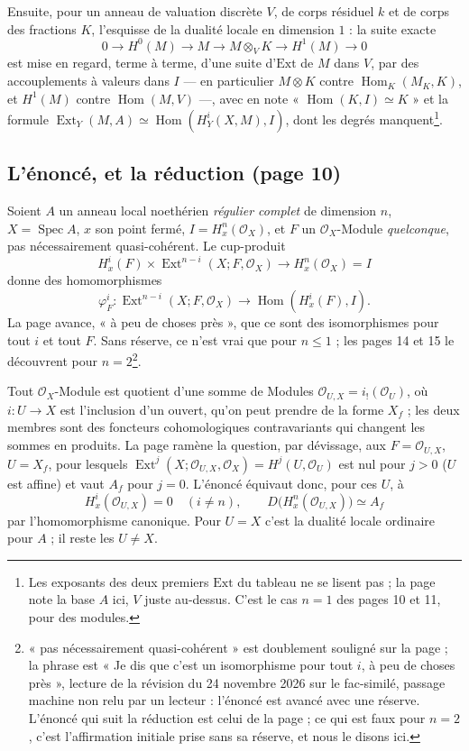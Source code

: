 \documentclass[11pt,a4paper]{article}
\begin{document}
Ensuite, pour un anneau de valuation discrète $V$, de corps résiduel $k$ et de
corps des fractions $K$, l'esquisse de la dualité locale en dimension $1$ :
la suite exacte
\[
  0 \to H^0(M) \to M \to M \otimes_V K \to H^1(M) \to 0
\]
est mise en regard, terme à terme, d'une suite d'$\mathrm{Ext}$ de $M$ dans
$V$, par des accouplements à valeurs dans $I$ --- en particulier
$M \otimes K$ contre $\operatorname{Hom}_K(M_K, K)$, et $H^1(M)$ contre
$\operatorname{Hom}(M, V)$ ---, avec en note « $\operatorname{Hom}(K, I)
\simeq K$ » et la formule
$\operatorname{Ext}_Y(M, A) \simeq \operatorname{Hom}(H^i_Y(X, M), I)$, dont
les degrés manquent\footnote{Les exposants des deux premiers $\mathrm{Ext}$ du
tableau ne se lisent pas ; la page note la base $A$ ici, $V$ juste au-dessus.
C'est le cas $n = 1$ des pages 10 et 11, pour des modules.}.

\subsection*{L'énoncé, et la réduction (page 10)}

Soient $A$ un anneau local noethérien \emph{régulier complet} de dimension $n$,
$X = \operatorname{Spec} A$, $x$ son point fermé, $I = H^n_x(\mathcal{O}_X)$,
et $F$ un $\mathcal{O}_X$-Module \emph{quelconque}, pas nécessairement
quasi-cohérent. Le cup-produit
\[
  H^i_x(F) \times \operatorname{Ext}^{n-i}(X; F, \mathcal{O}_X) \to
  H^n_x(\mathcal{O}_X) = I
\]
donne des homomorphismes
\[
  \varphi^{i}_F : \operatorname{Ext}^{n-i}(X; F, \mathcal{O}_X) \longrightarrow
  \operatorname{Hom}(H^i_x(F), I).
\]
La page avance, « à peu de choses près », que ce sont des isomorphismes pour
tout $i$ et tout $F$. Sans réserve, ce
n'est vrai que pour $n \leqslant 1$ ; les pages 14 et 15 le découvrent pour
$n = 2$\footnote{« pas nécessairement quasi-cohérent » est doublement souligné
sur la page ; la phrase est « Je dis que c'est un isomorphisme pour tout $i$,
à peu de choses près », lecture de la révision du 24 novembre 2026 sur le fac-similé,
passage machine non relu par un lecteur : l'énoncé est avancé avec une
réserve. L'énoncé qui suit la réduction est celui de
la page ; ce qui est faux pour $n = 2$, c'est l'affirmation initiale prise sans sa
réserve, et nous le disons ici.}.

Tout $\mathcal{O}_X$-Module est quotient d'une somme de Modules
$\mathcal{O}_{U,X} = i_{!}(\mathcal{O}_U)$, où $i : U \to X$ est l'inclusion
d'un ouvert, qu'on peut prendre de la forme $X_f$ ; les deux membres sont des
foncteurs cohomologiques contravariants qui changent les sommes en produits.
La page ramène la question, par dévissage, aux $F = \mathcal{O}_{U,X}$, $U = X_f$,
pour lesquels $\operatorname{Ext}^{j}(X; \mathcal{O}_{U,X}, \mathcal{O}_X) =
H^j(U, \mathcal{O}_U)$ est nul pour $j > 0$ ($U$ est affine) et vaut $A_f$ pour
$j = 0$. L'énoncé équivaut donc, pour ces $U$, à
\[
  H^i_x(\mathcal{O}_{U,X}) = 0 \quad (i \neq n), \qquad
  D\bigl(H^n_x(\mathcal{O}_{U,X})\bigr) \simeq A_f
\]
par l'homomorphisme canonique. Pour $U = X$ c'est la dualité locale ordinaire
pour $A$ ; il reste les $U \neq X$.
\end{document}
